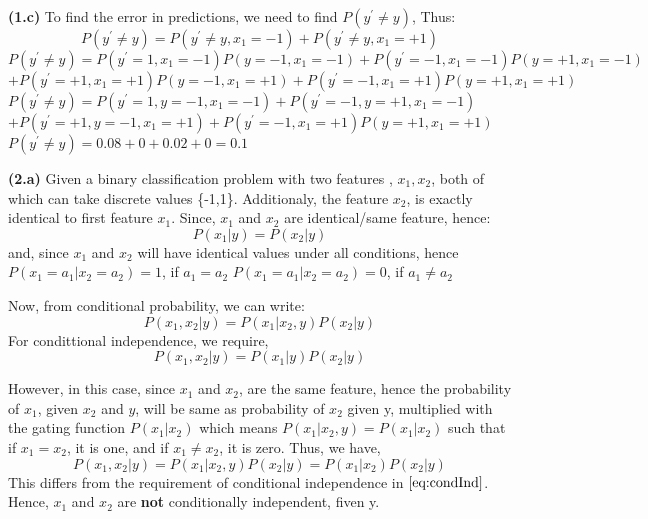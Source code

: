 \documentclass{article}
\renewcommand\part[1]{\vspace{.10in}\textbf{(#1)}}
\begin{document}
  \part{1.c} To find the error in predictions, we need to find $P(y^\prime \neq y)$, Thus:
  \[ P(y^\prime \neq y) = P(y^\prime \neq y, x_1 = -1) + P(y^\prime \neq y, x_1 = +1)\]
  $P(y^\prime \neq y) = P(y^\prime = 1,x_1 = -1)P(y=-1,x_1=-1) + P(y^\prime =-1,x_1 = -1)P(y=+1,x_1=-1)$ \newline
	$ + P(y^\prime = +1, x_1 = +1)P(y=-1, x_1 = +1) + P(y^\prime = -1, x_1 = +1)P(y=+1, x_1 = +1)$ \newline
  $P(y^\prime \neq y) = P(y^\prime = 1,y=-1,x_1 = -1) + P(y^\prime =-1,y=+1,x_1 = -1)$ \newline
	$ + P(y^\prime = +1,y=-1, x_1 = +1) + P(y^\prime = -1, x_1 = +1)P(y=+1, x_1 = +1)$ \newline
  $P(y^\prime \neq y) = 0.08 + 0 + 0.02 + 0 = 0.1 $


 \part{2.a} Given a binary classification problem with two features , $x_1,x_2$, both of which can take discrete values \{-1,1\}. Additionaly, the feature $x_2$, is exactly identical to first feature $x_1$. \newline
	Since, $x_1$ and $x_2$ are identical/same feature, hence:
	\[P(x_1 |y) = P(x_2|y)\]
	and, since $x_1$ and $x_2$ will have identical values under all conditions, hence\newline
	$P(x_1 = a_1 | x_2 = a_2) = 1$, if $a_1 = a_2$ \newline
	$P(x_1 = a_1 | x_2 = a_2) = 0$, if $a_1 \neq a_2$ \newline

	Now, from conditional probability, we can write:
	\[P(x_1,x_2 | y) = P(x_1 | x_2,y) P(x_2 | y)\]
	For condittional independence, we require,
	\begin{equation}
		P(x_1,x_2 | y) = P(x_1 | y) P(x_2|y)
		\label{eq:condInd}
	\end{equation}

	However, in this case, since $x_1$ and $x_2$, are the same feature, hence the probability of $x_1$, given $x_2$ and $y$, will be same as probability of $x_2$ given y, multiplied with the gating function $P(x_1 | x_2)$ which means $P(x_1 | x_2,y) = P(x_1 | x_2)$ such that if $x_1=x_2$, it is one, and if $x_1 \neq x_2$, it is zero. Thus, we have,
	\[P(x_1,x_2 | y) = P(x_1 | x_2,y) P(x_2 | y) = P(x_1 | x_2) P(x_2|y)\]
	This differs from the requirement of conditional independence in $\eqref{eq:condInd}$. Hence, $x_1$ and $x_2$ are \textbf {not} conditionally independent, fiven y. 
\end{document}
